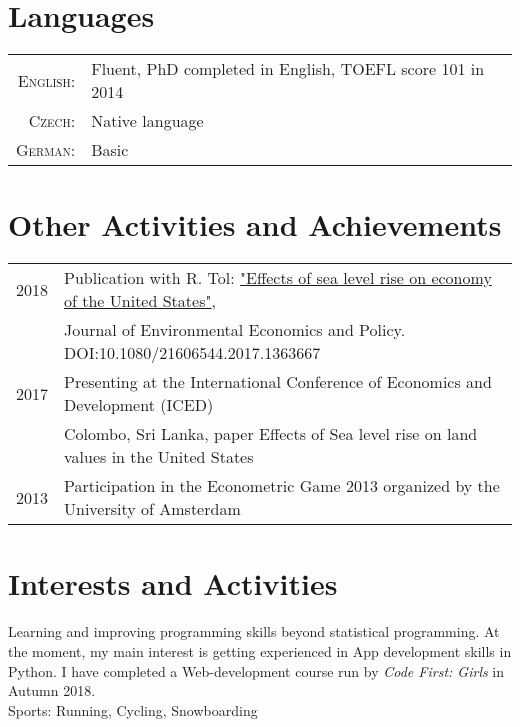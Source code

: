 \documentclass[a4paper,10pt]{article}
\begin{document}
\section{Languages}
\begin{tabular}{rl}
\textsc{English:}&Fluent, PhD completed in English, TOEFL score 101 in 2014\\
\textsc{Czech:}&Native language\\
\textsc{German:}&Basic\\
\end{tabular}


\section{Other Activities and Achievements}
\begin{tabular}{rl}
2018 & Publication with R. Tol:  \href{https://www.tandfonline.com/doi/full/10.1080/21606544.2017.1363667}{"Effects of sea level rise on economy of the United States"},\\
  &Journal of Environmental Economics and Policy. DOI:10.1080/21606544.2017.1363667\normalsize\\
 2017 & Presenting at the International Conference of Economics and Development (ICED)\normalsize\\
 &  Colombo, Sri Lanka, paper Effects of Sea level rise on land values in the United States\normalsize\\
 2013 & Participation in the Econometric Game 2013 organized by the University of Amsterdam
\end{tabular}

\section{Interests and Activities}
Learning and improving programming skills beyond statistical programming. At the moment, my main interest is getting experienced in App development skills in Python. I have completed a  Web-development course run by \textit{Code First: Girls} in Autumn 2018.
\vspace{0.15cm} \\
Sports: Running, Cycling, Snowboarding
\vspace{0.5cm}

\end{document}
